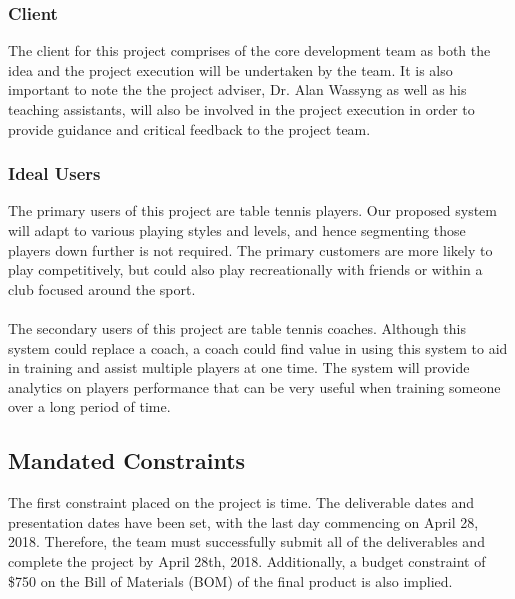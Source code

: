 \documentclass[11pt]{article}
\begin{document}
\subsubsection{Client}
The client for this project comprises of the core development team as both the idea and the project execution will be undertaken by the team. It is also important to note the the project adviser, Dr. Alan Wassyng as well as his teaching assistants, will also be involved in the project execution in order to provide guidance and critical feedback to the project team.
\subsubsection{Ideal Users}
The primary users of this project are table tennis players. Our proposed system will adapt to various playing styles and levels, and hence segmenting those players down further is not required. The primary customers are more likely to play competitively, but could also play recreationally with friends or within a club focused around the sport. \\\\
The secondary users of this project are table tennis coaches. Although this system could replace a coach, a coach could find value in using this system to aid in training and assist multiple players at one time. The system will provide analytics on players performance that can be very useful when training someone over a long period of time.
\subsection{Mandated Constraints}
The first constraint placed on the project is time. The deliverable dates and presentation dates have been set, with the last day commencing on April 28, 2018. Therefore, the team must successfully submit all of the deliverables and complete the project by April 28th, 2018. Additionally, a budget constraint of \$750 on the Bill of Materials (BOM) of the final product is also implied.
\end{document}
